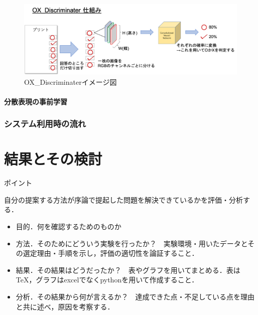 \documentclass[a4j,11pt,report]{jsbook}
\newcommand{\point}[1]{
\begin{itembox}[l]{ポイント}
  #1
\end{itembox}
}
\begin{document}
\begin{figure}[ht]
  \begin{center}
    \includegraphics[width = 15cm]{image/OX_Discriminater.png}
    \caption{OX_Discriminaterイメージ図}
    \label{fig:OX_Discriminater_image}
  \end{center}
\end{figure}

\subsubsection{分散表現の事前学習}

\subsection{システム利用時の流れ}

\subsection{}
\subsection{}
\subsection{}
\subsection{}






\chapter{結果とその検討 \label{ch:result}}

\point{
自分の提案する方法が序論で提起した問題を解決できているかを評価・分析する．
\begin{itemize}
  \item 目的．何を確認するためのものか
  \item 方法．そのためにどういう実験を行ったか？　実験環境・用いたデータとその選定理由・手順を示し，評価の適切性を論証すること．
  \item 結果．その結果はどうだったか？　表やグラフを用いてまとめる．表はTeX，グラフはexcelでなくpythonを用いて作成すること．
  \item 分析．その結果から何が言えるか？　達成できた点・不足している点を理由と共に述べ，原因を考察する．
\end{itemize}
}
\end{document}
